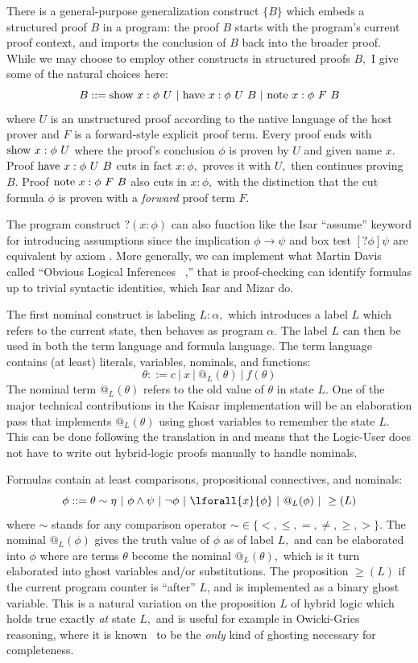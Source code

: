\documentclass[12pt]{cmuthesis}
\theoremstyle{definition}
\theoremstyle{remark}
\begin{document}
There is a general-purpose generalization construct $\{B\}$ which embeds a structured proof $B$ in a program: the proof $B$ starts with the program's current proof context, and imports the conclusion of $B$ back into the broader proof.
While we may choose to employ other constructs in structured proofs $B,$ I give some of the natural choices here:
\[B ::= \sshow{x}{\phi}{U}\ |\ \shave{x}{\phi}{U}{B}\ |\ \snote{x}{\phi}{F}{B}\]
where $U$ is an unstructured proof according to the native language of the host prover and $F$ is a forward-style explicit proof term.
Every proof ends with $\text{show}~{x}:{\phi}~{U}$ where the proof's conclusion $\phi$ is proven by $U$ and given name $x$.
Proof $\text{have}~{x}:{\phi}~{U}~{B}$ cuts in fact $x:\phi,$ proves it with $U,$ then continues proving $B$.
Proof $\text{note}~{x}:{\phi}~{F}~{B}$ also cuts in $x:\phi,$ with the distinction that the cut formula $\phi$ is proven with a \emph{forward} proof term $F$.

The program construct $?(x:\phi)$ can also function like the Isar ``assume'' keyword for introducing assumptions since  the implication $\phi \rightarrow \psi$ and box test $[?\phi]\psi$ are equivalent by axiom .
More generally, we can implement what Martin Davis called ``Obvious Logical Inferences~\cite{DBLP:conf/ijcai/Davis81} ,''
 that is proof-checking can identify formulas up to trivial syntactic identities, which Isar and Mizar do.

The first nominal construct is labeling $L: \alpha,$ which introduces a label $L$ which refers to the current state, then behaves as program $\alpha$.
The label $L$ can then be used in both the term language and formula language.
The term language contains (at least) literals, variables, nominals, and functions:
\[\theta ::= c\ |\ x\ |\ @_L(\theta)\ |\ f(\theta)\]
The nominal term $@_L(\theta)$ refers to the old value of $\theta$ in state $L$.
One of the major technical contributions in the Kaisar implementation will be an elaboration pass that implements $@_L(\theta)$ using ghost variables to remember the state $L$.
This can be done following the translation in \cite{DBLP:conf/lics/BohrerP18} and means that the Logic-User does not have to write out hybrid-logic proofs manually to handle nominals.

\newcommand{\eafter}[1]{\geq(#1)}
Formulas contain at least comparisons, propositional connectives, and nominals:
\[\phi ::=  \theta \sim \eta\ |\ \phi \land \psi\ |\ \neg \phi\ |\ \lforall{x}{\phi}\ |\ @_L(\phi)\ |\ \eafter{L}\]
where $\sim$ stands for any comparison operator $\sim \in \{<,\leq,=,\neq,\geq,>\}$.
The nominal $@_L(\phi)$ gives the truth value of $\phi$ as of label $L,$ and can be elaborated into $\phi$ where are terms $\theta$ become the nominal $@_L(\theta),$ which is it turn elaborated into ghost variables and/or substitutions.
The proposition $\eafter{L}$ if the current program counter is ``after'' $L$, and is implemented as a binary ghost variable.
This is a natural variation on the proposition $L$ of hybrid logic which holds true exactly \emph{at} state $L,$ and is useful for example in Owicki-Gries~\cite{Owicki1976} reasoning, where it is known~\cite{DBLP:journals/tse/Lamport77} to be the \emph{only} kind of ghosting necessary for completeness.
\end{document}
